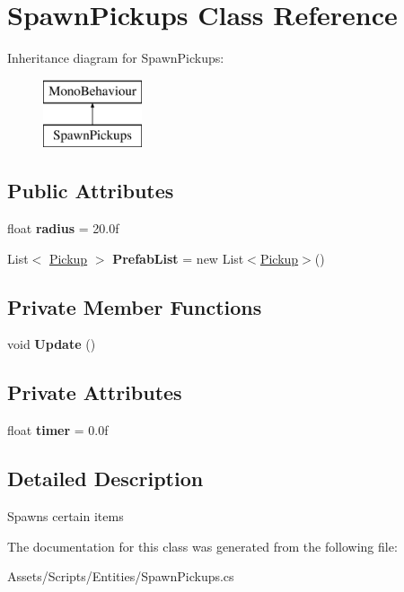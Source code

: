 \hypertarget{class_spawn_pickups}{}\section{Spawn\+Pickups Class Reference}
\label{class_spawn_pickups}
Inheritance diagram for Spawn\+Pickups\+:\begin{figure}[H]
\begin{center}
\leavevmode
\includegraphics[height=2.000000cm]{class_spawn_pickups}
\end{center}
\end{figure}
\subsection*{Public Attributes}
\begin{DoxyCompactItemize}
\item 
\mbox{\label{class_spawn_pickups_a2784fda860bf537ba9c2c798a9454146}} 
float {\bfseries radius} = 20.\+0f
\item 
\mbox{\label{class_spawn_pickups_aef77ed42b74aa4ebd643dac1bb3119e1}} 
List$<$ \hyperlink{class_pickup}{Pickup} $>$ {\bfseries Prefab\+List} = new List$<$\hyperlink{class_pickup}{Pickup}$>$()
\end{DoxyCompactItemize}
\subsection*{Private Member Functions}
\begin{DoxyCompactItemize}
\item 
\mbox{\label{class_spawn_pickups_a964eeb8fdc5f9158be949895c16fa9c7}} 
void {\bfseries Update} ()
\end{DoxyCompactItemize}
\subsection*{Private Attributes}
\begin{DoxyCompactItemize}
\item 
\mbox{\label{class_spawn_pickups_a20980cde8781cd088722db7ebdb1ce6d}} 
float {\bfseries timer} = 0.\+0f
\end{DoxyCompactItemize}


\subsection{Detailed Description}
Spawns certain items 

The documentation for this class was generated from the following file\+:\begin{DoxyCompactItemize}
\item 
Assets/\+Scripts/\+Entities/Spawn\+Pickups.\+cs\end{DoxyCompactItemize}
